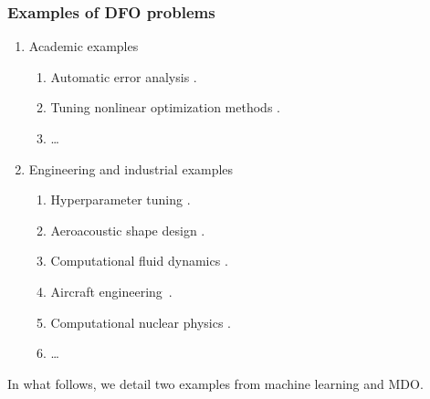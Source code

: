 \documentclass{polyu-presentation}
\begin{document}
\begin{frame}
    \frametitle{Examples of DFO problems}

    \begin{enumerate}
        \item Academic examples
        \begin{enumerate}
            \item Automatic error analysis \parencite{Higham_1993,Higham_2002}.
            \item Tuning nonlinear optimization methods \parencite{Audet_Orban_2006}.
            \item \dots
        \end{enumerate}
        \item Engineering and industrial examples
        \begin{enumerate}
            \item \alert<2>{Hyperparameter tuning} \parencite{Ghanbari_Scheinberg_2017}.
            \item Aeroacoustic shape design \parencite{Marsden_2004,Marsden_Etal_2004}.
            \item Computational fluid dynamics \parencite{Duvigneau_Visonneau_2004}.
            \item \alert<2>{Aircraft engineering}~\parencite{Gazaix_Etal_2019}.
            \item Computational nuclear physics \parencite{Eldred_Etal_2022}.
            \item \dots
        \end{enumerate}
    \end{enumerate}

    \medskip

    \pause
    \begin{block}{}
        In what follows, we detail two examples from \alert{machine learning} and \alert{MDO}.
    \end{block}
\end{frame}
\end{document}
